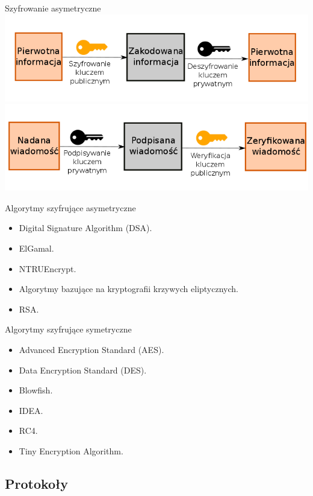 \begin{frame}{Szyfrowanie asymetryczne}
		\includegraphics[height=0.25\paperwidth]{images/pub-key.png} \\
		\includegraphics[height=0.25\paperwidth]{images/pub-key-sign.png}
\end{frame}

\begin{frame}{Algorytmy szyfrujące asymetryczne}
	\begin{itemize}
		\item Digital Signature Algorithm (DSA).
		\item ElGamal.
		\item NTRUEncrypt.
		\item Algorytmy bazujące na kryptografii krzywych eliptycznych.
		\item RSA.
	\end{itemize}
\end{frame}

\begin{frame}{Algorytmy szyfrujące symetryczne}
	\begin{itemize}
		\item Advanced Encryption Standard (AES).
		\item Data Encryption Standard (DES).
		\item Blowfish.
		\item IDEA.
		\item RC4.
		\item Tiny Encryption Algorithm.
	\end{itemize}
\end{frame}

\subsection{Protokoły}

